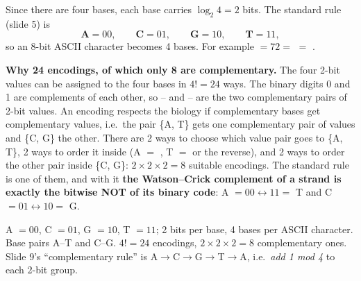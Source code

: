 Since there are four bases, each base carries $\log_2 4 = 2$ bits. The standard rule (slide 5) is
\[
\textbf{A} = 00, \qquad \textbf{C} = 01, \qquad \textbf{G} = 10, \qquad \textbf{T} = 11,
\]
so an 8-bit ASCII character becomes 4 bases. For example  $= 72 = $  $=$ .

\textbf{Why 24 encodings, of which only 8 are complementary.} The four 2-bit values can be assigned to the four bases in $4! = 24$ ways. The binary digits 0 and 1 are complements of each other, so -- and -- are the two complementary pairs of 2-bit values. An encoding respects the biology if complementary bases get complementary values, i.e.\ the pair \{A, T\} gets one complementary pair of values and \{C, G\} the other. There are 2 ways to choose which value pair goes to \{A, T\}, 2 ways to order it inside (A $=$ , T $=$  or the reverse), and 2 ways to order the other pair inside \{C, G\}: $2 \times 2 \times 2 = 8$ suitable encodings. The standard rule is one of them, and with it \textbf{the Watson--Crick complement of a strand is exactly the bitwise NOT of its binary code}: A $= 00 \leftrightarrow 11 = $ T and C $= 01 \leftrightarrow 10 = $ G.

\begin{mustknow}
A $= 00$, C $= 01$, G $= 10$, T $= 11$; 2 bits per base, 4 bases per ASCII character. Base pairs A--T and C--G. $4! = 24$ encodings, $2 \times 2 \times 2 = 8$ complementary ones. Slide 9's ``complementary rule'' is A$\to$C$\to$G$\to$T$\to$A, i.e.\ \emph{add 1 mod 4} to each 2-bit group.
\end{mustknow}


